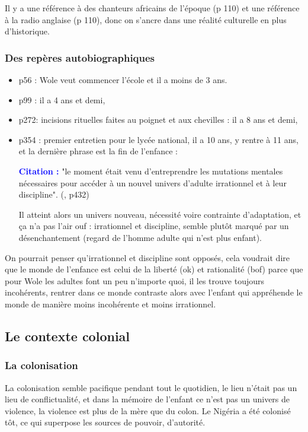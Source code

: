 \documentclass[a4paper, 11pt, hidelinks]{article}
\newcommand{\bs}{\bigskip}
\newcommand{\cit}{\large \textcolor{blue}{\textbf{Citation :}} \large }
\newcommand{\rb}[1]{\Romanbar{#1}}
\begin{document}
Il y a une référence à des chanteurs africains de l'époque (p 110) et une référence à la radio anglaise (p 110), 
donc on s'ancre dans une réalité culturelle en plus d'historique.


\subsubsection{Des repères autobiographiques}


\begin{itemize}
    \item p56 : Wole veut commencer l'école et il a moins de 3 ans.
    \item p99 : il a 4 ans et demi, 
    \item p272: incisions rituelles faites au poignet et aux chevilles : il a 8 ans et demi, 
    \item p354 : premier entretien pour le lycée national, il a 10 ans, y rentre à 11 ans, et la dernière phrase est la fin de l'enfance : 
    

    \cit "le moment était venu d'entreprendre les mutations mentales nécessaires pour accéder à un nouvel univers 
d'adulte irrationnel et à leur discipline". (\rb{15}, p432)


Il atteint alors un univers nouveau, nécessité voire contrainte d'adaptation, et ça n'a pas l'air ouf : 
irrationnel et discipline, semble plutôt marqué par un désenchantement (regard de l'homme adulte qui 
n'est plus enfant).
\end{itemize}

\bs
On pourrait penser qu'irrationnel et discipline sont opposés, cela voudrait dire que le monde de 
l'enfance est celui de la liberté (ok) et rationalité (bof) parce que pour Wole les adultes font 
un peu n'importe quoi, il les trouve toujours incohérents, rentrer dans ce monde contraste alors 
avec l'enfant qui appréhende le monde de manière moins incohérente et moins irrationnel. 

\subsection{Le contexte colonial}


\subsubsection{La colonisation}

La colonisation semble pacifique pendant tout le quotidien, le lieu n'était pas un lieu de 
conflictualité, et dans la mémoire de l'enfant ce n'est pas un univers de violence, la violence 
est plus de la mère que du colon. Le Nigéria a été colonisé tôt, ce qui superpose les sources de 
pouvoir, d'autorité. 
\end{document}
